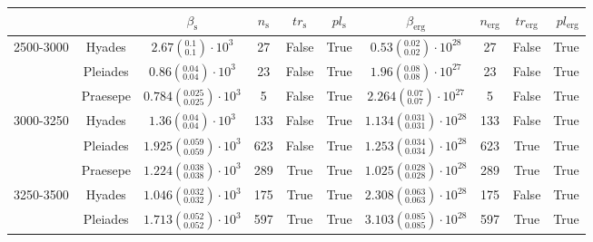 \begin{tabular}{lccccccccr}
\hline
          &         &                                $\beta_\mathrm{s}$ & $n_\mathrm{s}$ & $tr_\mathrm{s}$ & $pl_\mathrm{s}$ &                               $\beta_\mathrm{erg}$ & $n_\mathrm{erg}$ & $tr_\mathrm{erg}$ & $pl_\mathrm{erg}$ \\
\hline
2500-3000 & Hyades &       $2.67\left(^{0.1}_{0.1}\right)\cdot 10^{3}$ &             27 &           False &            True &     $0.53\left(^{0.02}_{0.02}\right)\cdot 10^{28}$ &               27 &             False &              True \\
          & Pleiades &     $0.86\left(^{0.04}_{0.04}\right)\cdot 10^{3}$ &             23 &           False &            True &     $1.96\left(^{0.08}_{0.08}\right)\cdot 10^{27}$ &               23 &             False &              True \\
          & Praesepe &  $0.784\left(^{0.025}_{0.025}\right)\cdot 10^{3}$ &              5 &           False &            True &    $2.264\left(^{0.07}_{0.07}\right)\cdot 10^{27}$ &                5 &             False &              True \\
3000-3250 & Hyades &     $1.36\left(^{0.04}_{0.04}\right)\cdot 10^{3}$ &            133 &           False &            True &  $1.134\left(^{0.031}_{0.031}\right)\cdot 10^{28}$ &              133 &             False &              True \\
          & Pleiades &  $1.925\left(^{0.059}_{0.059}\right)\cdot 10^{3}$ &            623 &           False &            True &  $1.253\left(^{0.034}_{0.034}\right)\cdot 10^{28}$ &              623 &              True &              True \\
          & Praesepe &  $1.224\left(^{0.038}_{0.038}\right)\cdot 10^{3}$ &            289 &            True &            True &  $1.025\left(^{0.028}_{0.028}\right)\cdot 10^{28}$ &              289 &              True &              True \\
3250-3500 & Hyades &  $1.046\left(^{0.032}_{0.032}\right)\cdot 10^{3}$ &            175 &            True &            True &  $2.308\left(^{0.063}_{0.063}\right)\cdot 10^{28}$ &              175 &             False &              True \\
          & Pleiades &  $1.713\left(^{0.052}_{0.052}\right)\cdot 10^{3}$ &            597 &            True &            True &  $3.103\left(^{0.085}_{0.085}\right)\cdot 10^{28}$ &              597 &              True &              True \\

\end{tabular}
